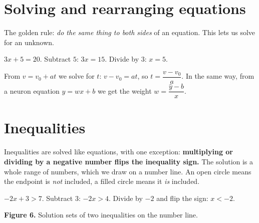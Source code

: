 \label{ch:algebra}

\section*{Solving and rearranging equations}
The golden rule: \emph{do the same thing to both sides} of an equation. This lets us solve for an unknown.

\begin{example}
$3x+5=20$. Subtract $5$: $3x=15$. Divide by $3$: $x=5$.
\end{example}

\begin{example}
From $v=v_0+at$ we solve for $t$: $v-v_0=at$, so $t=\dfrac{v-v_0}{a}$. In the same way, from a neuron equation $\hat y=wx+b$ we get the weight $w=\dfrac{\hat y-b}{x}$.
\end{example}

\section*{Inequalities}
Inequalities are solved like equations, with one exception: \textbf{multiplying or dividing by a negative number flips the inequality sign.} The solution is a whole range of numbers, which we draw on a number line. An open circle means the endpoint is \emph{not} included, a filled circle means it \emph{is} included.

\begin{example}
$-2x+3>7$. Subtract $3$: $-2x>4$. Divide by $-2$ and flip the sign: $x<-2$.
\end{example}

\begin{center}

\small\textbf{Figure 6.} Solution sets of two inequalities on the number line.
\end{center}

